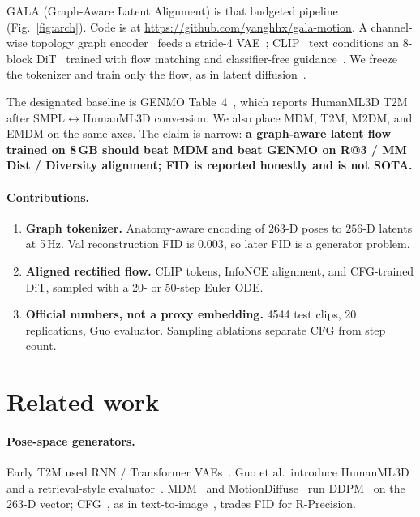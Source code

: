 \documentclass[10pt,twocolumn]{article}
\begin{document}
GALA (Graph-Aware Latent Alignment) is that budgeted pipeline (Fig.~\ref{fig:arch}).
Code is at \url{https://github.com/yanghhx/gala-motion}.
A channel-wise topology graph encoder~\cite{chen2021ctrgcn,yan2018stgcn} feeds a stride-4 VAE~\cite{kingma2014vae}; CLIP~\cite{radford2021clip} text conditions an 8-block DiT~\cite{peebles2023dit} trained with flow matching and classifier-free guidance~\cite{ho2022cfg}.
We freeze the tokenizer and train only the flow, as in latent diffusion~\cite{rombach2022ldm}.

The designated baseline is GENMO Table~4~\cite{li2025genmo}, which reports HumanML3D T2M after SMPL$\leftrightarrow$HumanML3D conversion.
We also place MDM, T2M, M2DM, and EMDM on the same axes.
The claim is narrow: \textbf{a graph-aware latent flow trained on 8\,GB should beat MDM and beat GENMO on R@3 / MM Dist / Diversity alignment; FID is reported honestly and is not SOTA.}

\paragraph{Contributions.}
\begin{enumerate}\itemsep2pt
\item \textbf{Graph tokenizer.} Anatomy-aware encoding of $263$-D poses to $256$-D latents at 5\,Hz. Val reconstruction FID is $0.003$, so later FID is a generator problem.
\item \textbf{Aligned rectified flow.} CLIP tokens, InfoNCE alignment, and CFG-trained DiT, sampled with a 20- or 50-step Euler ODE.
\item \textbf{Official numbers, not a proxy embedding.} 4544 test clips, 20 replications, Guo evaluator. Sampling ablations separate CFG from step count.
\end{enumerate}

\section{Related work}

\paragraph{Pose-space generators.}
Early T2M used RNN / Transformer VAEs~\cite{lin2018generating,ahuja2019language2pose,petrovich2021actor,petrovich2022temos,ghosh2021synthesis}.
Guo et al.\ introduce HumanML3D and a retrieval-style evaluator~\cite{guo2022humanml3d,guo2022tm2t}.
MDM~\cite{tevet2023mdm} and MotionDiffuse~\cite{zhang2022motiondiffuse} run DDPM~\cite{ho2020ddpm,nichol2021improved} on the $263$-D vector; CFG~\cite{ho2022cfg}, as in text-to-image~\cite{saharia2022imagen}, trades FID for R-Precision.
\end{document}
